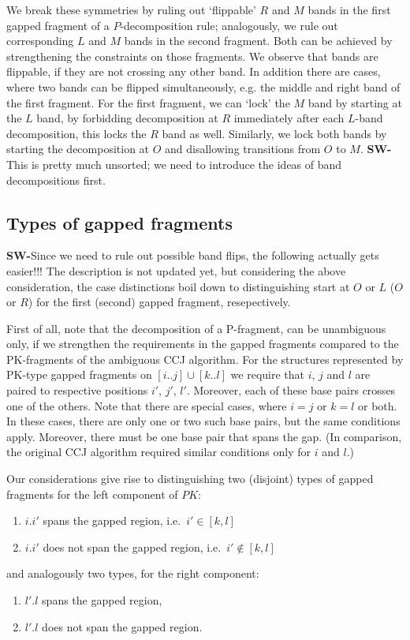 \documentclass[11pt]{article} %
\newcommand{\SW}[1]{\textbf{SW-}#1}
\newcommand{\PKnone}{P\!K}
\begin{document}
We break these symmetries by ruling out `flippable' $R$ and $M$ bands in the first gapped fragment of a $P$-decomposition rule; analogously, we rule out corresponding $L$ and $M$ bands in the second fragment. Both can be achieved by strengthening the constraints on those fragments.
We observe that bands are flippable, if they are not crossing any other band. In addition there are cases, where two bands can be flipped simultaneously, e.g. the middle and right band of the first fragment.
For the first fragment, we can `lock' the $M$ band by starting at the $L$ band, by forbidding decomposition at $R$ immediately after each $L$-band decomposition, this locks the $R$ band as well. Similarly, we lock both bands by starting the decomposition at $O$ and disallowing transitions from $O$ to $M$. \SW{This is pretty much unsorted; we need to introduce the ideas of band decompositions first.}

\subsection{Types of gapped fragments}

\SW{Since we need to rule out possible band flips, the following actually gets easier!!! The description is not updated yet, but considering the above consideration, the case distinctions boil down to distinguishing start at $O$ or $L$ ($O$ or $R$) for the first (second) gapped fragment, resepectively.}

First of all, note that the decomposition of a P-fragment, can be unambiguous
only, if we strengthen the requirements in the gapped fragments compared to the
PK-fragments of the ambiguous CCJ algorithm.  For the structures represented by
PK-type gapped fragments on $[i..j]\cup[k..l]$ we require that $i$, $j$ and $l$
are paired to respective positions $i'$, $j'$, $l'$. Moreover, each of these
base pairs crosses one of the others.  Note that there are special
cases, where $i=j$ or $k=l$ or both. In these cases, there are only one or two
such base pairs, but the same conditions apply. Moreover, there must be one
base pair that spans the gap. (In comparison, the original CCJ algorithm
required similar conditions only for $i$ and $l$.)

Our considerations give rise to distinguishing two (disjoint) types of gapped
fragments for the left component of $\PKnone$:
\begin{enumerate}
\item $i.i'$ spans the gapped region, i.e.\ $i'\in[k,l]$
\item $i.i'$ does not span the gapped region, i.e.\ $i'\not\in[k,l]$ 
\end{enumerate}
and analogously two types, for the right component:
\begin{enumerate}
\item $l'.l$ spans the gapped region,
\item $l'.l$ does not span the gapped region.
\end{enumerate}
\end{document}
